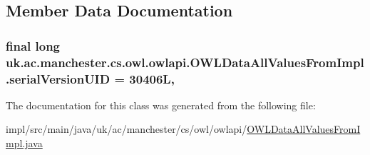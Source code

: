 \subsection{Member Data Documentation}
\hypertarget{classuk_1_1ac_1_1manchester_1_1cs_1_1owl_1_1owlapi_1_1_o_w_l_data_all_values_from_impl_a6461cd432e17600fad50b30aa4da5dd2}{
\subsubsection[{serial\-Version\-U\-I\-D}]{\setlength{\rightskip}{0pt plus 5cm}final long uk.\-ac.\-manchester.\-cs.\-owl.\-owlapi.\-O\-W\-L\-Data\-All\-Values\-From\-Impl.\-serial\-Version\-U\-I\-D = 30406\-L\hspace{0.3cm}{\ttfamily [static]}, {\ttfamily [private]}}}\label{classuk_1_1ac_1_1manchester_1_1cs_1_1owl_1_1owlapi_1_1_o_w_l_data_all_values_from_impl_a6461cd432e17600fad50b30aa4da5dd2}


The documentation for this class was generated from the following file\-:\begin{DoxyCompactItemize}
\item 
impl/src/main/java/uk/ac/manchester/cs/owl/owlapi/\hyperlink{_o_w_l_data_all_values_from_impl_8java}{O\-W\-L\-Data\-All\-Values\-From\-Impl.\-java}\end{DoxyCompactItemize}
